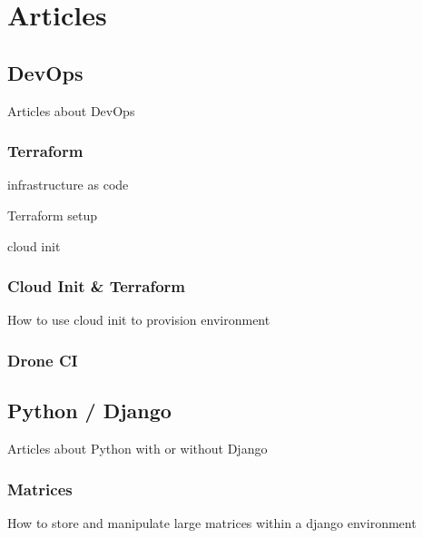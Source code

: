 \documentclass[letterpaper,10pt,english]{sphinxmanual}
\begin{document}
\chapter{Articles}
\label{\detokenize{index:articles}}
\sphinxstepscope


\section{DevOps}
\label{\detokenize{articles/devops/index:devops}}\label{\detokenize{articles/devops/index::doc}}
\sphinxAtStartPar
Articles about DevOps

\sphinxstepscope


\subsection{Terraform}
\label{\detokenize{articles/devops/terraform:terraform}}\label{\detokenize{articles/devops/terraform::doc}}
\sphinxAtStartPar
infrastructure as code

\sphinxAtStartPar
Terraform setup

\sphinxAtStartPar
cloud init

\sphinxstepscope


\subsection{Cloud Init \& Terraform}
\label{\detokenize{articles/devops/cloud_init:cloud-init-terraform}}\label{\detokenize{articles/devops/cloud_init::doc}}
\sphinxAtStartPar
How to use cloud init to provision environment

\sphinxstepscope


\subsection{Drone CI}
\label{\detokenize{articles/devops/drone_ci:drone-ci}}\label{\detokenize{articles/devops/drone_ci::doc}}
\sphinxstepscope


\section{Python / Django}
\label{\detokenize{articles/python_django/index:python-django}}\label{\detokenize{articles/python_django/index::doc}}
\sphinxAtStartPar
Articles about Python with or without Django

\sphinxstepscope


\subsection{Matrices}
\label{\detokenize{articles/python_django/matrices:matrices}}\label{\detokenize{articles/python_django/matrices::doc}}
\sphinxAtStartPar
How to store and manipulate large matrices within a django environment
\end{document}
